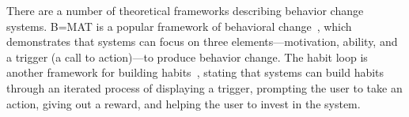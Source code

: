 There are a number of theoretical frameworks describing behavior change systems. B=MAT is a popular framework of behavioral change~\cite{fogg2002persuasive}, which demonstrates that systems can focus on three elements---motivation, ability, and a trigger (a call to action)---to produce behavior change. The habit loop is another framework for building habits~\cite{eyal2014hooked}, stating that systems can build habits through an iterated process of displaying a trigger, prompting the user to take an action, giving out a reward, and helping the user to invest in the system.





